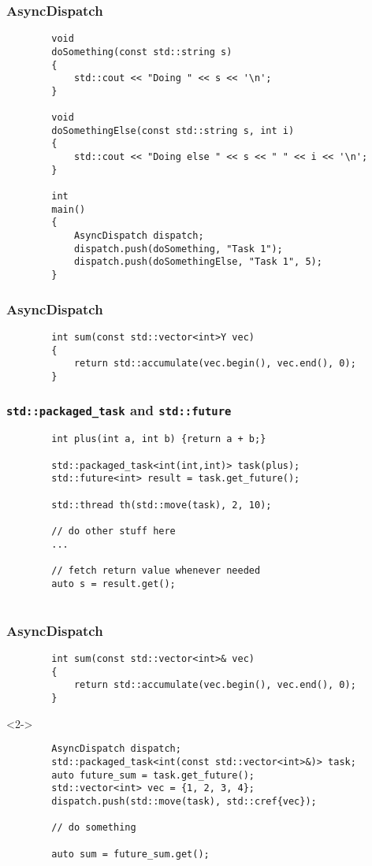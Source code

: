 \documentclass{beamer}
\begin{document}
\begin{frame}[fragile]
\frametitle{AsyncDispatch}
    \begin{lstlisting}
        void
        doSomething(const std::string s)
        {
            std::cout << "Doing " << s << '\n';
        }

        void
        doSomethingElse(const std::string s, int i)
        {
            std::cout << "Doing else " << s << " " << i << '\n';
        }

        int
        main()
        {
            AsyncDispatch dispatch;
            dispatch.push(doSomething, "Task 1");
            dispatch.push(doSomethingElse, "Task 1", 5);
        }
    \end{lstlisting}
\end{frame}

\begin{frame}[fragile]
\frametitle{AsyncDispatch}
    \begin{lstlisting}
        int sum(const std::vector<int>Y vec)
        {
            return std::accumulate(vec.begin(), vec.end(), 0);
        }
    \end{lstlisting}
\end{frame}

\begin{frame}[fragile]
\frametitle{\texttt{std::packaged\_task} and \texttt{std::future}}
    \begin{lstlisting}
        int plus(int a, int b) {return a + b;}

        std::packaged_task<int(int,int)> task(plus);
        std::future<int> result = task.get_future();
     
        std::thread th(std::move(task), 2, 10);

        // do other stuff here
        ...
    
        // fetch return value whenever needed
        auto s = result.get();
        
    \end{lstlisting}

\end{frame}

\begin{frame}[fragile]
\frametitle{AsyncDispatch}
    \begin{lstlisting}
        int sum(const std::vector<int>& vec)
        {
            return std::accumulate(vec.begin(), vec.end(), 0);
        }
    \end{lstlisting}

    \begin{onlyenv}<2->
    \begin{lstlisting}
        AsyncDispatch dispatch;
        std::packaged_task<int(const std::vector<int>&)> task;
        auto future_sum = task.get_future();
        std::vector<int> vec = {1, 2, 3, 4};
        dispatch.push(std::move(task), std::cref{vec});

        // do something

        auto sum = future_sum.get();
    \end{lstlisting}
    \end{onlyenv}
\end{frame}
\end{document}
